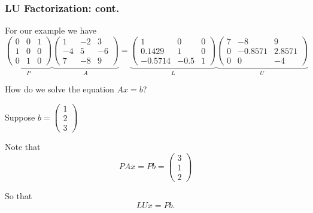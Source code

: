 \documentclass{beamer}
\begin{document}
\begin{frame}\frametitle{LU Factorization: cont.}
	For our example we have
	{\footnotesize
	\[
		\underbrace{
			\begin{pmatrix}
    			0 & 0 & 1\\
    			1 & 0 & 0\\
    			0 & 1 & 0
  			\end{pmatrix}
  		}_{P}
		\underbrace{
			\begin{pmatrix}
    			1 & -2 & 3\\
    			-4 & 5 & -6\\
    			7 & -8 & 9
			\end{pmatrix}
		}_{A}
		= 
		\underbrace{
			\begin{pmatrix}
    			1 & 0 & 0\\
    			0.1429 & 1 & 0\\
    			-0.5714 & -0.5 & 1
			\end{pmatrix}
		}_{L}
		\underbrace{
			\begin{pmatrix}
				7 & -8 & 9\\
    			0 & -0.8571 & 2.8571\\
    			0 & 0 & -4	
			\end{pmatrix}
		}_{U}
	\]
	}
	
	How do we solve the equation $ Ax = b$?

	Suppose 
	\(
		b = \begin{pmatrix} 
				1 \\ 2 \\ 3 
			\end{pmatrix}
	\)

	Note that 
	\[ 
		PAx = Pb 
		    = \begin{pmatrix} 
		    	3 \\ 1 \\ 2 
		      \end{pmatrix}
	\]

	So that
	\[ 
		LUx = Pb. 
	\]

\end{frame}
\end{document}
